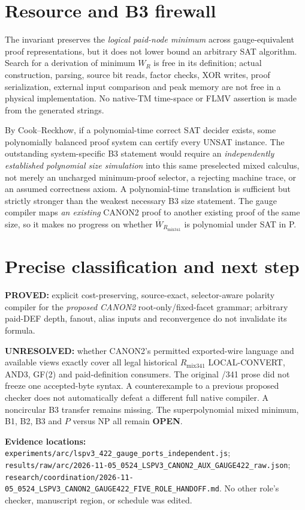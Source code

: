 \documentclass[11pt]{article}
\begin{document}
\section*{Resource and B3 firewall}
The invariant preserves the \emph{logical paid-node minimum} across
gauge-equivalent proof representations, but it does not lower bound
an arbitrary SAT algorithm. Search for a derivation of minimum \(W_R\)
is free in its definition; actual construction, parsing, source
bit reads, factor checks, XOR writes, proof serialization,
external input comparison and peak memory are not free in a
physical implementation. No native-TM time-space or FLMV assertion
is made from the generated strings.

By Cook--Reckhow, if a polynomial-time correct SAT decider exists,
some polynomially balanced proof system can certify every UNSAT
instance. The outstanding system-specific B3 statement would require
an \emph{independently established polynomial size simulation}
into this same preselected mixed calculus, not merely an uncharged
minimum-proof selector, a rejecting machine trace, or an assumed
correctness axiom. A polynomial-time translation is sufficient but
strictly stronger than the weakest necessary B3 size statement.
The gauge compiler maps \emph{an existing} CANON2 proof to another
existing proof of the same size, so it makes no progress on whether
\(\overline W_{R_{\mathrm{mix341}}}\) is polynomial under SAT in P.

\section*{Precise classification and next step}
\textbf{PROVED:} explicit cost-preserving, source-exact, selector-aware
polarity compiler for the \emph{proposed CANON2} root-only/fixed-facet
grammar; arbitrary paid-DEF depth, fanout, alias inputs and
reconvergence do not invalidate its formula.

\textbf{UNRESOLVED:} whether CANON2's permitted exported-wire
language and available views exactly cover all legal historical
\(R_{\mathrm{mix341}}\) LOCAL-CONVERT, AND3, GF(2) and paid-definition
consumers. The original /341 prose did not freeze one accepted-byte
syntax. A counterexample to a previous proposed checker does
not automatically defeat a different full native compiler.
A noncircular B3 transfer remains missing.
The superpolynomial mixed minimum, B1, B2, B3 and \(P\) versus NP
all remain \textbf{OPEN}.

\noindent\textbf{Evidence locations:}
\texttt{experiments/arc/lspv3\_422\_gauge\_ports\_independent.js};
\texttt{results/raw/arc/2026-11-05\_0524\_LSPV3\_CANON2\_AUX\_GAUGE422\_raw.json};
\texttt{research/coordination/2026-11-05\_0524\_LSPV3\_CANON2\_GAUGE422\_FIVE\_ROLE\_HANDOFF.md}.
No other role's checker, manuscript region, or schedule was edited.
\end{document}
